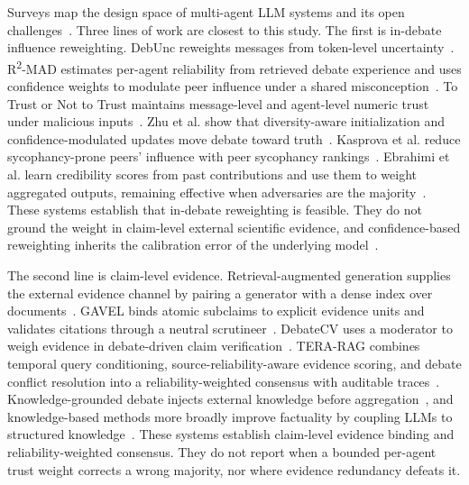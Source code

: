 \documentclass[a4paper,fleqn]{cas-sc}
\begin{document}
Surveys map the design space of multi-agent LLM systems and its open challenges~\cite{li2024survey}. Three lines of work are closest to this study. The first is in-debate influence reweighting. DebUnc reweights messages from token-level uncertainty~\cite{yoffe-etal-2025-debunc}. R\textsuperscript{2}-MAD estimates per-agent reliability from retrieved debate experience and uses confidence weights to modulate peer influence under a shared misconception~\cite{jin2026r2mad}. To Trust or Not to Trust maintains message-level and agent-level numeric trust under malicious inputs~\cite{he2026trust}. Zhu et al. show that diversity-aware initialization and confidence-modulated updates move debate toward truth~\cite{zhu2026demystifying}. Kasprova et al. reduce sycophancy-prone peers' influence with peer sycophancy rankings~\cite{kasprova2026polite}. Ebrahimi et al. learn credibility scores from past contributions and use them to weight aggregated outputs, remaining effective when adversaries are the majority~\cite{ebrahimi2025adversary}. These systems establish that in-debate reweighting is feasible. They do not ground the weight in claim-level external scientific evidence, and confidence-based reweighting inherits the calibration error of the underlying model~\cite{guo2017calibration}.

The second line is claim-level evidence. Retrieval-augmented generation supplies the external evidence channel by pairing a generator with a dense index over documents~\cite{lewis2020retrieval}. GAVEL binds atomic subclaims to explicit evidence units and validates citations through a neutral scrutineer~\cite{xu2026gavel}. DebateCV uses a moderator to weigh evidence in debate-driven claim verification~\cite{he2026debatecv}. TERA-RAG combines temporal query conditioning, source-reliability-aware evidence scoring, and debate conflict resolution into a reliability-weighted consensus with auditable traces~\cite{truong2026terarag}. Knowledge-grounded debate injects external knowledge before aggregation~\cite{wang2025learning}, and knowledge-based methods more broadly improve factuality by coupling LLMs to structured knowledge~\cite{yang2025comprehensive}. These systems establish claim-level evidence binding and reliability-weighted consensus. They do not report when a bounded per-agent trust weight corrects a wrong majority, nor where evidence redundancy defeats it.
\end{document}
